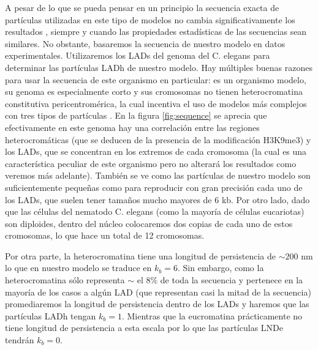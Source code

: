 A pesar de lo que se pueda pensar en un principio la secuencia exacta de partículas utilizadas en este tipo de modelos no cambia significativamente los resultados \cite{Bajpai2021}, siempre y cuando las propiedades estadísticas de las secuencias sean similares. No obstante, basaremos la secuencia de nuestro modelo en datos experimentales. Utilizaremos los LADs del genoma del C. elegans \cite{Ho2014,C.elegans1998} para determinar las partículas LADh de nuestro modelo. Hay múltiples buenas razones para usar la secuencia de este organismo en particular: es un organismo modelo, su genoma es especialmente corto y sus cromosomas no tienen heterocromatina constitutiva pericentromérica, la cual incentiva el uso de modelos más complejos con tres tipos de partículas \cite{Falk2019}. En la figura \ref{fig:sequence} se aprecia que efectivamente en este genoma hay una correlación entre las regiones heterocromáticas (que se deducen de la presencia de la modificación H3K9me3) y los LADs, que se concentran en los extremos de cada cromosoma (la cual es una característica peculiar de este organismo pero no alterará los resultados como veremos más adelante). También se ve como las partículas de nuestro modelo son suficientemente pequeñas como para reproducir con gran precisión cada uno de los LADs, que suelen tener tamaños mucho mayores de 6 kb. Por otro lado, dado que las células del nematodo C. elegans (como la mayoría de células eucariotas) son diploides, dentro del núcleo colocaremos dos copias de cada uno de estos cromosomas, lo que hace un total de 12 cromosomas.

Por otra parte, la heterocromatina tiene una longitud de persistencia de $\sim200$ nm \cite{Bystricky2004} lo que en nuestro modelo se traduce en $k_b=6$. Sin embargo, como la heterocromatina sólo representa $\sim$ el $8\%$ de toda la secuencia y pertenece en la mayoría de los casos a algún LAD (que representan casi la mitad de la secuencia) promediaremos la longitud de persistencia dentro de los LADs y haremos que las partículas LADh tengan $k_b=1$. Mientras que la eucromatina prácticamente no tiene longitud de persistencia a esta escala por lo que las partículas LNDe tendrán $k_b=0$.

